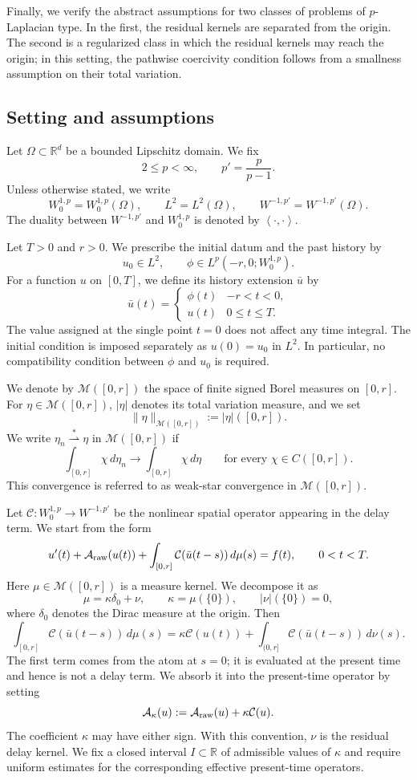 \documentclass[a4paper,11pt,oneside,reqno]{amsart}
\newcounter{c}
\newcounter{d}
\newcounter{b}
\newcommand{\R}{\mathbb{R}}
\newcommand{\dual}[2]{\left\langle #1,#2\right\rangle}
\newcommand{\M}{\mathcal{M}}
\begin{document}
Finally, we verify the abstract assumptions for two classes of problems of
\(p\)-Laplacian type. In the first, the residual kernels are separated from
the origin. The second is a regularized class in which the residual kernels
may reach the origin; in this setting, the pathwise coercivity condition
follows from a smallness assumption on their total variation.


\subsection{Setting and assumptions}

Let $\Omega\subset\R^d$ be a bounded Lipschitz domain. We fix
\[
 2\le p<\infty,\qquad p'=\frac{p}{p-1}.
\]
Unless otherwise stated, we write
\[
 W^{1,p}_0=W^{1,p}_0(\Omega),\qquad L^2=L^2(\Omega),\qquad W^{-1,p'}=W^{-1,p'}(\Omega).
\]
The duality between $W^{-1,p'}$ and $W^{1,p}_0$ is denoted by $\dual{\cdot}{\cdot}$.

Let $T>0$ and $r>0$. We prescribe the initial datum and the past history by
\[
 u_0\in L^2,\qquad
 \phi\in L^p(-r,0;W^{1,p}_0).
\]
For a function $u$ on $[0,T]$, we define its history extension $\bar u$ by
\[
 \bar u(t)=
 \begin{cases}
  \phi(t)& -r<t<0,\\
  u(t)& 0\le t\le T.
 \end{cases}
\]
The value assigned at the single point $t=0$ does not affect any time
integral. The initial condition is imposed separately as $u(0)=u_0$ in $L^2$. 
In particular, no compatibility condition between $\phi$ and $u_0$
is required.

We denote by $\M([0,r])$ the space of finite signed Borel measures on $[0,r]$. 
For $\eta\in\M([0,r])$, $|\eta|$ denotes its total variation
measure, and we set
\[
 \|\eta\|_{\M([0,r])}:=|\eta|([0,r]).
\]
We write $\eta_n\stackrel{*}{\rightharpoonup}\eta$ in $\M([0,r])$ if
\[
 \int_{[0,r]}\chi\,d\eta_n\to\int_{[0,r]}\chi\,d\eta
 \qquad\text{for every }\chi\in C([0,r]).
\]
This convergence is referred to as weak-star convergence in $\M([0,r])$.

Let $\mathcal C:W^{1,p}_0\to W^{-1,p'}$ be the nonlinear spatial operator appearing in the delay term.
We start from the form
\[
 u'(t)+\mathcal A_{\rm raw}(u(t))
 +\int_{[0,r]}\mathcal C(\bar u(t-s))\,d\mu(s)
 =f(t),
 \qquad 0<t<T.
\]
Here $\mu\in\M([0,r])$ is a measure kernel. We decompose it as
\[
 \mu=\kappa\delta_0+\nu,\qquad
 \kappa=\mu(\{0\}),\qquad
 |\nu|(\{0\})=0,
\]
where $\delta_0$ denotes the Dirac measure at the origin. Then
\[
 \int_{[0,r]}\mathcal C(\bar u(t-s))\,d\mu(s)=
 \kappa\mathcal C(u(t))+\int_{(0,r]}\mathcal C(\bar u(t-s))\,d\nu(s).
\]
The first term comes from the atom at $s=0$; it is evaluated at the present
time and hence is not a delay term. We absorb it into the present-time operator by setting
\[
 \mathcal A_\kappa(u):=\mathcal A_{\rm raw}(u)+\kappa\mathcal C(u).
\]
The coefficient $\kappa$ may have either sign. With this convention,
$\nu$ is the residual delay kernel. We fix a closed interval $I\subset\R$ of
admissible values of $\kappa$ and require uniform estimates for the
corresponding effective present-time operators.
\end{document}
